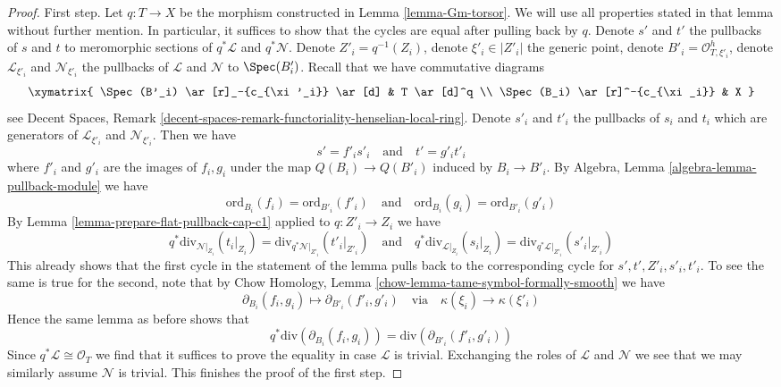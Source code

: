 \begin{proof}
\medskip\noindent
First step. Let $q : T \to X$ be the morphism constructed in
Lemma \ref{lemma-Gm-torsor}. We will use all properties stated in
that lemma without further mention. In particular, it suffices to
show that the cycles are equal after pulling back by $q$.
Denote $s'$ and $t'$ the pullbacks of $s$ and $t$ to meromorphic sections
of $q^*\mathcal{L}$ and $q^*\mathcal{N}$.
Denote $Z'_i = q^{-1}(Z_i)$, denote $\xi'_i \in |Z'_i|$ the generic point,
denote $B'_i = \mathcal{O}_{T, \xi'_i}^h$, denote
$\mathcal{L}_{\xi'_i}$ and $\mathcal{N}_{\xi'_i}$ the pullbacks
of $\mathcal{L}$ and $\mathcal{N}$ to $\Spec(B'_i)$.
Recall that we have commutative diagrams
$$
\xymatrix{
\Spec(B'_i) \ar[r]_-{c_{\xi'_i}} \ar[d] & T \ar[d]^q \\
\Spec(B_i) \ar[r]^-{c_{\xi_i}} & X
}
$$
see Decent Spaces, Remark
\ref{decent-spaces-remark-functoriality-henselian-local-ring}.
Denote $s'_i$ and $t'_i$ the pullbacks of $s_i$ and $t_i$ which
are generators of $\mathcal{L}_{\xi'_i}$ and $\mathcal{N}_{\xi'_i}$.
Then we have
$$
s' = f'_i s'_i
\quad\text{and}\quad
t' = g'_i t'_i
$$
where $f'_i$ and $g'_i$ are the images of $f_i, g_i$
under the map $Q(B_i) \to Q(B'_i)$ induced by $B_i \to B'_i$.
By Algebra, Lemma \ref{algebra-lemma-pullback-module} we have
$$
\text{ord}_{B_i}(f_i) = \text{ord}_{B'_i}(f'_i)
\quad\text{and}\quad
\text{ord}_{B_i}(g_i) = \text{ord}_{B'_i}(g'_i)
$$
By Lemma \ref{lemma-prepare-flat-pullback-cap-c1} applied
to $q : Z'_i \to Z_i$ we have
$$
q^*\text{div}_{\mathcal{N}|_{Z_i}}(t_i|_{Z_i}) =
\text{div}_{q^*\mathcal{N}|_{Z'_i}}(t'_i|_{Z'_i})
\quad\text{and}\quad
q^*\text{div}_{\mathcal{L}|_{Z_i}}(s_i|_{Z_i}) =
\text{div}_{q^*\mathcal{L}|_{Z'_i}}(s'_i|_{Z'_i})
$$
This already shows that the first cycle in the statement of the
lemma pulls back to the corresponding cycle for
$s', t', Z'_i, s'_i, t'_i$. To see the same is true for the
second, note that by
Chow Homology, Lemma \ref{chow-lemma-tame-symbol-formally-smooth} we have
$$
\partial_{B_i}(f_i, g_i) \mapsto
\partial_{B'_i}(f'_i, g'_i)
\quad\text{via}\quad
\kappa(\xi_i) \to \kappa(\xi'_i)
$$
Hence the same lemma as before shows that
$$
q^*\text{div}(\partial_{B_i}(f_i, g_i)) =
\text{div}(\partial_{B'_i}(f'_i, g'_i))
$$
Since $q^*\mathcal{L} \cong \mathcal{O}_T$ we find that it suffices
to prove the equality in case $\mathcal{L}$ is trivial.
Exchanging the roles of $\mathcal{L}$ and $\mathcal{N}$ we
see that we may similarly assume $\mathcal{N}$ is trivial.
This finishes the proof of the first step.


\end{proof}
